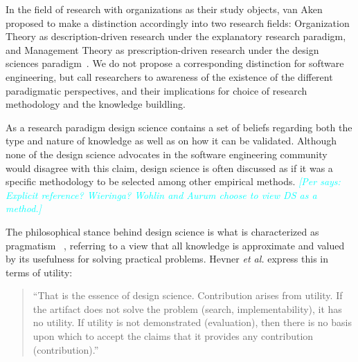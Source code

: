 \documentclass[graybox]{svmult}
\newcommand{\emelie}[1]{\textcolor{red}{{\it [Emelie says: #1]}}}
\newcommand{\per}[1]{\textcolor{cyan}{{\it [Per says: #1]}}}
\newcommand{\emelie}[1]{}
\newcommand{\per}[1]{}
\begin{document}
In the field of research with organizations as their study objects, van Aken proposed to make a distinction accordingly into two research fields: Organization Theory as description-driven research under the explanatory research paradigm, and Management Theory as prescription-driven research under the design sciences paradigm~\cite{van_aken_management_2004}.  We do not propose a corresponding distinction for software engineering, but call researchers to awareness of the existence of the different paradigmatic perspectives, and their implications for choice of research methodology and the knowledge buildling.

As a research paradigm design science contains a set of beliefs regarding both the type and nature of knowledge as well as on how it can be validated. Although none of the design science advocates in the software engineering community would disagree with this claim, design science is often discussed as if it was a specific methodology to be selected among other empirical methods. \per{Explicit reference? Wieringa? Wohlin and Aurum \cite{Wohlin2015} choose to view DS as a method.}

The philosophical stance behind design science is what is characterized as pragmatism~\cite{easterbrook_selecting_2008}%
, referring to a view that all knowledge is approximate and valued by its usefulness for solving practical problems. Hevner \emph{et al.} express this in terms of utility: 

\begin{quote}
	``That is the essence of design science. Contribution arises from utility. If the artifact does not solve the problem (search, implementability), it has no utility. If utility is not demonstrated (evaluation), then there is no basis upon which to accept the claims that it provides any contribution (contribution).''~\cite[p. 91]{hevner_design_2004}
\end{quote}

\end{document}
